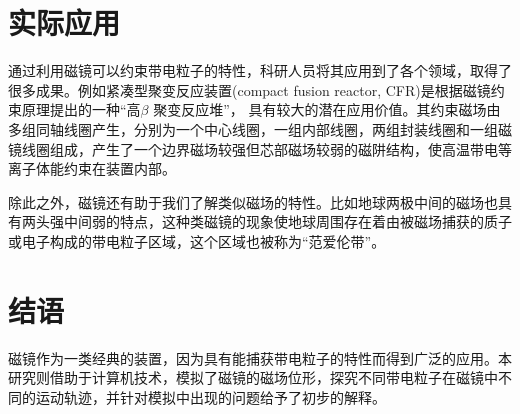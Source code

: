 \documentclass{ctexart}
\begin{document}
\section{实际应用}
通过利用磁镜可以约束带电粒子的特性，科研人员将其应用到了各个领域，取得了很多成果。例如紧凑型聚变反应装置(compact  fusion  reactor,  CFR)是根据磁镜约束原理提出的一种“高$\beta$ 聚变反应堆”，
具有较大的潜在应用价值。其约束磁场由多组同轴线圈产生，分别为一个中心线圈，一组内部线圈，两组封装线圈和一组磁镜线圈组成，产生了一个边界磁场较强但芯部磁场较弱的磁阱结构，使高温带电等离子体能约束在装置内部。
\par
除此之外，磁镜还有助于我们了解类似磁场的特性。比如地球两极中间的磁场也具有两头强中间弱的特点，这种类磁镜的现象使地球周围存在着由被磁场捕获的质子或电子构成的带电粒子区域，这个区域也被称为“范爱伦带”。
\section{结语}
磁镜作为一类经典的装置，因为具有能捕获带电粒子的特性而得到广泛的应用。本研究则借助于计算机技术，模拟了磁镜的磁场位形，探究不同带电粒子在磁镜中不同的运动轨迹，并针对模拟中出现的问题给予了初步的解释。

\end{document}
